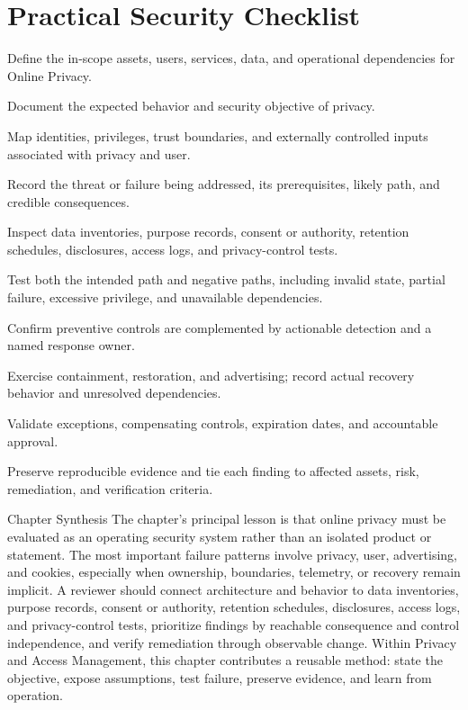 \documentclass[11pt,letterpaper]{article}
\begin{document}
\section*{Practical Security Checklist}
\begin{CornellChecklist}
\item Define the in-scope assets, users, services, data, and operational dependencies for Online Privacy.
\item Document the expected behavior and security objective of privacy.
\item Map identities, privileges, trust boundaries, and externally controlled inputs associated with privacy and user.
\item Record the threat or failure being addressed, its prerequisites, likely path, and credible consequences.
\item Inspect data inventories, purpose records, consent or authority, retention schedules, disclosures, access logs, and privacy-control tests.
\item Test both the intended path and negative paths, including invalid state, partial failure, excessive privilege, and unavailable dependencies.
\item Confirm preventive controls are complemented by actionable detection and a named response owner.
\item Exercise containment, restoration, and advertising; record actual recovery behavior and unresolved dependencies.
\item Validate exceptions, compensating controls, expiration dates, and accountable approval.
\item Preserve reproducible evidence and tie each finding to affected assets, risk, remediation, and verification criteria.
\end{CornellChecklist}
\begin{CornellSummaryBox}{Chapter Synthesis}
The chapter's principal lesson is that online privacy must be evaluated as an operating security system rather than an isolated product or statement. The most important failure patterns involve privacy, user, advertising, and cookies, especially when ownership, boundaries, telemetry, or recovery remain implicit. A reviewer should connect architecture and behavior to data inventories, purpose records, consent or authority, retention schedules, disclosures, access logs, and privacy-control tests, prioritize findings by reachable consequence and control independence, and verify remediation through observable change. Within Privacy and Access Management, this chapter contributes a reusable method: state the objective, expose assumptions, test failure, preserve evidence, and learn from operation.
\end{CornellSummaryBox}
\end{document}
